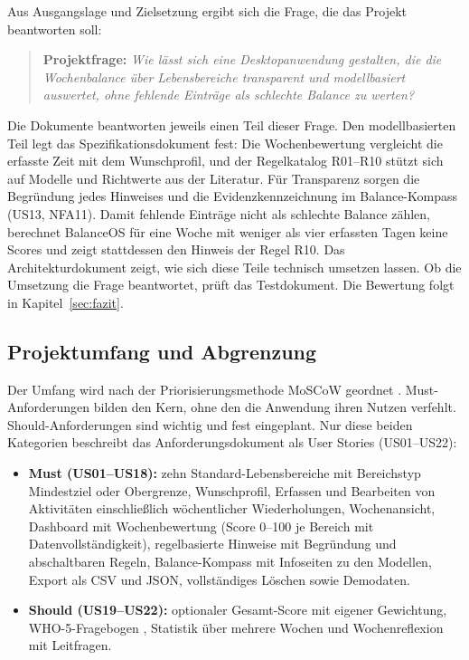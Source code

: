 Aus Ausgangslage und Zielsetzung ergibt sich die Frage, die das Projekt beantworten soll:
\begin{quote}
  \textbf{Projektfrage:} \emph{Wie lässt sich eine Desktopanwendung gestalten, die die Wochenbalance über Lebensbereiche transparent und modellbasiert auswertet, ohne fehlende Einträge als schlechte Balance zu werten?}
\end{quote}
Die Dokumente beantworten jeweils einen Teil dieser Frage. Den modellbasierten Teil legt das Spezifikationsdokument fest: Die Wochenbewertung vergleicht die erfasste Zeit mit dem Wunschprofil, und der Regelkatalog R01--R10 stützt sich auf Modelle und Richtwerte aus der Literatur. Für Transparenz sorgen die Begründung jedes Hinweises und die Evidenzkennzeichnung im Balance-Kompass (US13, NFA11). Damit fehlende Einträge nicht als schlechte Balance zählen, berechnet BalanceOS für eine Woche mit weniger als vier erfassten Tagen keine Scores und zeigt stattdessen den Hinweis der Regel R10. Das Architekturdokument zeigt, wie sich diese Teile technisch umsetzen lassen. Ob die Umsetzung die Frage beantwortet, prüft das Testdokument. Die Bewertung folgt in Kapitel~\ref{sec:fazit}.

\subsection{Projektumfang und Abgrenzung}
Der Umfang wird nach der Priorisierungsmethode \ac{MoSCoW} geordnet \parencite[Kap.~10]{dsdm2014}. Must-Anforderungen bilden den Kern, ohne den die Anwendung ihren Nutzen verfehlt. Should-Anforderungen sind wichtig und fest eingeplant. Nur diese beiden Kategorien beschreibt das Anforderungsdokument als User Stories (US01--US22):
\begin{itemize}
  \item \textbf{Must (US01--US18):} zehn Standard-Lebensbereiche mit Bereichstyp Mindestziel oder Obergrenze, Wunschprofil, Erfassen und Bearbeiten von Aktivitäten einschließlich wöchentlicher Wiederholungen, Wochenansicht, Dashboard mit Wochenbewertung (Score 0--100 je Bereich mit Datenvollständigkeit), regelbasierte Hinweise mit Begründung und abschaltbaren Regeln, Balance-Kompass mit Infoseiten zu den Modellen, Export als \ac{CSV} und \ac{JSON}, vollständiges Löschen sowie Demodaten.
  \item \textbf{Should (US19--US22):} optionaler Gesamt-Score mit eigener Gewichtung, WHO-5-Fragebogen \parencite[S.~167]{topp2015}, Statistik über mehrere Wochen und Wochenreflexion mit Leitfragen.
\end{itemize}

